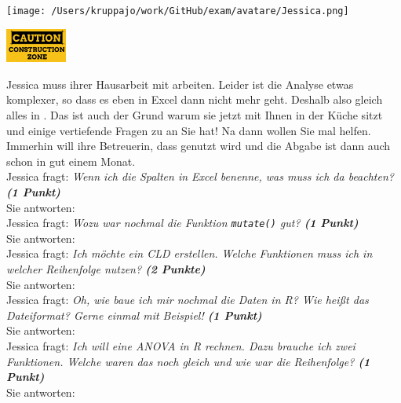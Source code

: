 \documentclass[a4paper, 9pt]{scrartcl}\usepackage[]{graphicx}\usepackage[]{xcolor}
\begin{document}
 
\begin{minipage}[t]{0.5\textwidth}
\texttt{[image: /Users/kruppajo/work/GitHub/exam/avatare/Jessica.png]}
\end{minipage}
\begin{minipage}[t]{0.5\textwidth}
\hfill
\href{https://youtu.be/C9skfFRTHhI}{\includegraphics[width = 2cm]{img/caution}}
\end{minipage}
\vspace{1ex}



Jessica muss ihrer Hausarbeit mit \Rlogo arbeiten. Leider ist die Analyse etwas komplexer, so dass es eben in Excel dann nicht mehr geht. Deshalb also gleich alles in \Rlogo. Das ist auch der Grund warum sie jetzt mit Ihnen in der Küche sitzt und einige vertiefende Fragen zu \Rlogo an Sie hat! Na dann wollen Sie mal helfen. Immerhin will ihre Betreuerin, dass \Rlogo genutzt wird und die Abgabe ist dann auch schon in gut einem Monat.\\[1Ex]

Jessica fragt: \textit{Wenn ich die Spalten in Excel benenne, was muss ich da beachten? \textbf{(1 Punkt)}}\\[1ex]
Sie antworten:\\[2Ex]

Jessica fragt: \textit{Wozu war nochmal die Funktion \texttt{mutate()} gut?  \textbf{(1 Punkt)}}\\[1ex]
Sie antworten:\\[2Ex]

Jessica fragt: \textit{Ich möchte ein CLD erstellen. Welche Funktionen muss ich in welcher Reihenfolge nutzen? \textbf{(2 Punkte)}}\\[1ex]
Sie antworten:\\[2Ex]

Jessica fragt: \textit{Oh, wie baue ich mir nochmal die Daten in R? Wie heißt das Dateiformat? Gerne einmal mit Beispiel! \textbf{(1 Punkt)}}\\[1ex]
Sie antworten:\\[2Ex]

Jessica fragt: \textit{Ich will eine ANOVA in R rechnen. Dazu brauche ich zwei Funktionen. Welche waren das noch gleich und wie war die Reihenfolge? \textbf{(1 Punkt)}}\\[1ex]
Sie antworten:\\[2Ex]
\end{document}
